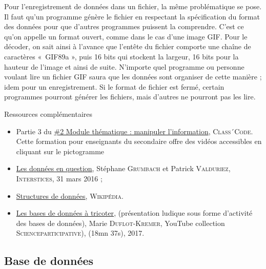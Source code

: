 Pour l'enregistrement de données dans un fichier, la même problématique se pose. Il faut qu'un programme génère le fichier en respectant la spécification du format des données pour que d'autres programmes puissent la comprendre. C'est ce qu'on appelle un format ouvert, comme dans le cas d'une image GIF. Pour le décoder, on sait ainsi à l'avance que l'entête du fichier comporte une chaîne de caractères «~GIF89a », puis 16 bits qui stockent la largeur, 16 bits pour la hauteur de l'image et ainsi de suite. N'importe quel programme ou personne voulant lire un fichier GIF saura que les données sont organiser de cette manière ; idem pour un enregistrement. Si le format de fichier est fermé, certain programmes pourront générer les fichiers, mais d'autres ne pourront pas les lire.

\begin{gofurther}{Ressources complémentaires}
\begin{itemize}\jazzitem
	\item Partie 3 du \href{https://pixees.fr/classcode/formations/module2/#partie3}{\#2 Module thématique : manipuler l’information}, \textsc{Class´Code}. Cette formation pour enseignants du secondaire offre des vidéos accessibles en cliquant sur le pictogramme 
\end{itemize}

\begin{itemize}\jazzitem
	\item \href{https://interstices.info/les-donnees-en-question}{Les données en question}, Stéphane \textsc{Grumbach} et Patrick \textsc{Valduriez}, \textsc{Interstices}, 31 mars 2016 ;
	\item \href{https://fr.wikipedia.org/wiki/Structure_de_donn\%C3\%A9es}{Structures de données}, \textsc{Wikipédia}.
\end{itemize}

\begin{itemize}\jazzitem
	\item \href{https://www.youtube.com/watch?v=qYEtsNym3FM&list=PLWvGMqXvyJAPSMFgCiy6qVHW9bAPu93X5&index=9}{Les bases de données à tricoter}, (présentation ludique sous forme d'activité des bases de données), Marie \textsc{Duflot-Kremer}, YouTube collection \textsc{Scienceparticipative}), (18mn 37s), 2017.
\end{itemize}
\end{gofurther}


\subsection[Base de données]{Base de données}
\label{sub:V.3.3}


